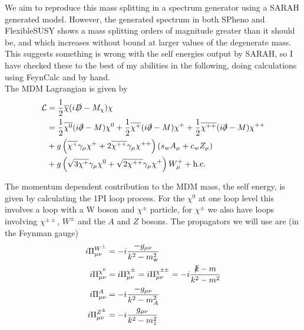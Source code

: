 \documentclass[11pt]{article}
\begin{document}
We aim to reproduce this mass splitting in a spectrum generator using a SARAH generated model.  However, the generated spectrum in both SPheno and FlexibleSUSY shows a mass splitting orders of magnitude greater than it should be, and which increases without bound at larger values of the degenerate mass.  This suggests something is wrong with the self energies output by SARAH, so I have checked these to the best of my abilities in the following, doing calculations using FeynCalc and by hand.\\


The MDM Lagrangian is given by
\begin{align}
\begin{split}
\mathcal{L}&=\frac{1}{2}\overline{\chi}(i\slashed{D}-M_{\chi})\chi\\
&=\frac{1}{2}\overline{\chi^0}(i\slashed{\partial}-M)\chi^0+\frac{1}{2}\overline{\chi^+}(i\slashed{\partial}-M)\chi^{+}+\frac{1}{2}\overline{\chi^{++}}(i\slashed{\partial}-M)\chi^{++}\\
&+g\left(\overline{\chi^+}\gamma_{\mu}\chi^++2\overline{\chi^{++}}\gamma_{\mu}\chi^{++}\right)\left(s_wA_{\mu}+c_wZ_{\mu}\right)\\
&+g\left(\sqrt{3}\overline{\chi^+}\gamma_{\mu}\chi^0+\sqrt{2}\overline{\chi^{++}}\gamma_{\mu}\chi^+\right)W_{\mu}^++\text{h.c.}
\end{split}
\end{align}


The momentum dependent contribution to the MDM mass, the self energy, is given by calculating the 1PI loop process.  For the $
\chi^0$ at one loop level this involves a loop with a W boson and $\chi^{\pm}$ particle, for $\chi^{\pm}$ we also have loops involving $
\chi^{\pm\pm}$, $W^{\pm}$ and the $A$ and $Z$ bosons.  The propagators we will use are (in the Feynman gauge)
\begin{align}
i\Pi^{W^{\pm}}_{\mu\nu}&=-i\frac{-g_{\mu\nu}}{k^2-m_{\text{w}}^2}\\
i\Pi^{\chi^{0}}_{\mu\nu}&=i\Pi^{\chi^{\pm}}_{\mu\nu}=i\Pi^{\chi^{\pm\pm}}_{\mu\nu}=-i\frac{\slashed{k}-m}{k^2-m^2}\\
i\Pi^{A}_{\mu\nu}&=-i\frac{-g_{\mu\nu}}{k^2-m_A^2}\\
i\Pi^{Z^{\pm}}_{\mu\nu}&=-i\frac{g_{\mu\nu}}{k^2-m_z^2}\\
\end{align}
\end{document}
